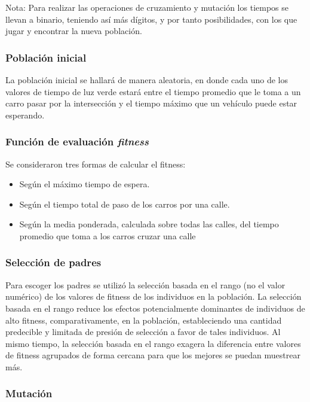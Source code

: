\documentclass[twoside,twocolumn]{article} %
\begin{document}
	Nota: Para realizar las operaciones de cruzamiento y mutaci\'on los tiempos se llevan a binario, teniendo as\'i m\'as d\'igitos, y por tanto posibilidades, con los que jugar y encontrar la nueva poblaci\'on.
	
	\subsubsection{Población inicial}
	
	La población inicial se hallará de manera aleatoria, en donde cada uno de los valores de tiempo de luz verde estará entre el tiempo promedio que le toma a un carro pasar por la intersección y el tiempo máximo que un vehículo puede estar esperando. 
	
	\subsubsection{Función de evaluación \textit{fitness}}
	
	Se consideraron tres formas de calcular el fitness:
	\begin{itemize}
		\item Seg\'un el m\'aximo tiempo de espera. 
		\item Seg\'un el tiempo total de paso de los carros por una calle. 
		\item Seg\'un la media ponderada, calculada sobre todas las calles, del tiempo promedio que toma a los carros cruzar una calle
	\end{itemize}

	\subsubsection{Selección de padres}
	
	Para escoger los padres se utiliz\'o la selección basada en el rango (no el valor numérico) de los valores de fitness de los individuos en la población. La selección basada en el rango reduce los efectos potencialmente dominantes de individuos de alto fitness, comparativamente, en la población, estableciendo una cantidad predecible y limitada de presión de selección a favor de tales individuos. Al mismo tiempo, la selección basada en el rango exagera la diferencia entre valores de fitness agrupados de forma cercana para que los mejores se puedan muestrear más.
	
	\subsubsection{Mutación}
	
\end{document}
